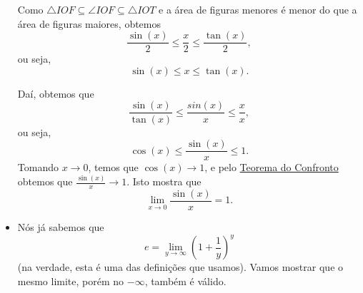 \begin{itemize}
	Como $\triangle IOF\subseteq\angle IOF\subseteq\triangle IOT$ e a área de figuras menores é menor do que a área de figuras maiores, obtemos
	\[\frac{\sin(x)}{2}\leq\frac{x}{2}\leq\frac{\tan(x)}{2},\]
	ou seja,
	\[\sin(x)\leq x\leq\tan(x).\]
	
	Daí, obtemos que
	\[\frac{\sin(x)}{\tan(x)}\leq \frac{sin(x)}{x}\leq \frac{x}{x},\]
	ou seja,
	\[\cos(x)\leq \frac{\sin(x)}{x}\leq 1.\]
	Tomando $x\to 0$, temos que $\cos(x)\to 1$, e pelo \href{teo_do_confronto_moodle.html}{Teorema do Confronto} obtemos que $\frac{\sin(x)}{x}\to 1$. Isto mostra que
	\[\lim_{x\to 0}\frac{\sin(x)}{x}=1.\]
	
	\item Nós já sabemos que
	\[e=\lim_{y\to\infty}\left(1+\frac{1}{y}\right)^y\]
	(na verdade, esta é uma das definições que usamos). Vamos mostrar que o mesmo limite, porém no $-\infty$, também é válido.
	

\end{itemize}
